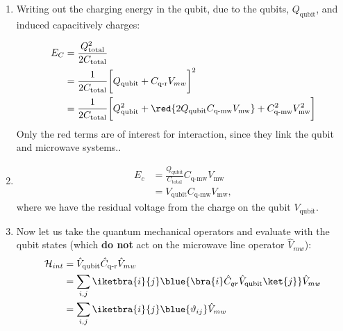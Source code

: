 \begin{minipage}{0.5\linewidth}%
  \begin{enumerate}%
  \item Writing out the charging energy in the qubit, due to the qubits,
    $ Q_\text{qubit} $, and induced capacitively charges:

    \begin{equation}\label{eq:couple2}
      \begin{aligned}
        E_C & = \frac{Q_\text{total}^2}{2C_\text{total}}\\
        & = \frac{1}{2C_\text{total}}\bigg[Q_\text{qubit} + {C_\text{q-r}V_{mw}}\bigg]^2\\
        & = {\frac{1}{2C_\text{total}}\bigg[Q_\text{qubit}^2 + \red{2Q_\text{qubit}C_\text{q-mw}V_\text{mw}} + C_\text{q-mw}^2V_\text{mw}^2\bigg]}\\
      \end{aligned}
    \end{equation}
    \noindent Only the red terms  are of interest for interaction, since
    they link  the qubit  and microwave systems..

  \item \begin{equation}\label{eq:couple3}
      \begin{aligned}
        E_c & = \frac{Q_\text{qubit}}{C_\text{total}}C_\text{q-mw}V_\text{mw}\\
        & = V_\text{qubit}C_\text{q-mw}V_\text{mw},
      \end{aligned}
    \end{equation}
    \noindent where we have the residual  voltage from the charge on the
    qubit $ V_\text{qubit} $.

  \item Now  let us take  the quantum mechanical operators  and evaluate
    with the  qubit states (which  \textbf{do not} act on  the microwave
    line operator $ \hat{V}_{mw} $):
    \begin{equation}\label{eq:couple4}
      \begin{aligned}
        \mathcal{H}_{int} & = \hat{V}_\text{qubit}\hat{C}_\text{q-r}\hat{V}_{mw} \\
        & = \sum_{i,j}\iketbra{i}{j}\blue{\bra{i}\hat{C}_{qr}\hat{V}_{\text{qubit}}\ket{j}} \hat{V}_{mw}\\
        & = \sum_{i,j}\iketbra{i}{j}\blue{\vartheta_{ij}} \hat{V}_{mw}\\
      \end{aligned}
    \end{equation}
  \end{enumerate}
\end{minipage}%
